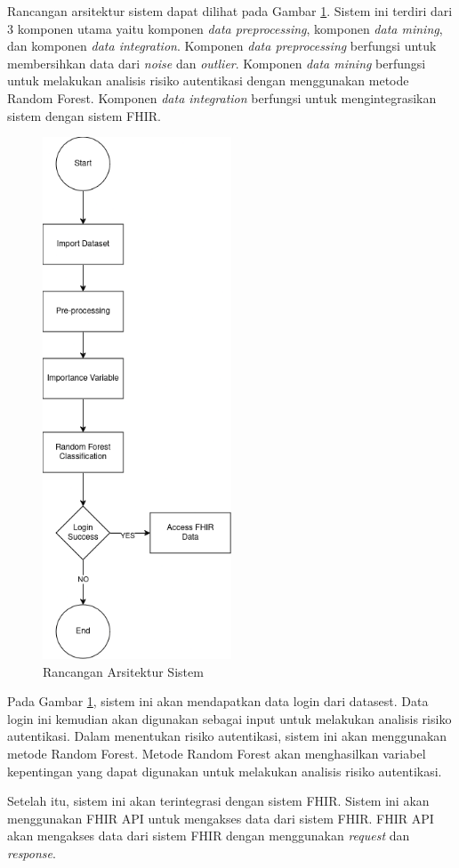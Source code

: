 Rancangan arsitektur sistem dapat dilihat pada Gambar \ref{fig:arsitektur-sistem}. Sistem ini terdiri dari 3 komponen utama yaitu komponen \textit{data preprocessing}, komponen \textit{data mining}, dan komponen \textit{data integration}. Komponen \textit{data preprocessing} berfungsi untuk membersihkan data dari \textit{noise} dan \textit{outlier}. Komponen \textit{data mining} berfungsi untuk melakukan analisis risiko autentikasi dengan menggunakan metode Random Forest. Komponen \textit{data integration} berfungsi untuk mengintegrasikan sistem dengan sistem FHIR.

\begin{figure}[H]
    \centering
    \includegraphics[width=0.5\textwidth]{BAB_TESIS/IMAGES/diagram_kusus.drawio.png}
    \caption{Rancangan Arsitektur Sistem}
    \label{fig:arsitektur-sistem}
\end{figure}

Pada Gambar \ref{fig:arsitektur-sistem}, sistem ini akan mendapatkan data login dari datasest. Data login ini kemudian akan digunakan sebagai input untuk melakukan analisis risiko autentikasi. Dalam menentukan risiko autentikasi, sistem ini akan menggunakan metode Random Forest. Metode Random Forest akan menghasilkan variabel kepentingan yang dapat digunakan untuk melakukan analisis risiko autentikasi.

Setelah itu, sistem ini akan terintegrasi dengan sistem FHIR. Sistem ini akan menggunakan FHIR API untuk mengakses data dari sistem FHIR. FHIR API akan mengakses data dari sistem FHIR dengan menggunakan \textit{request} dan \textit{response}.